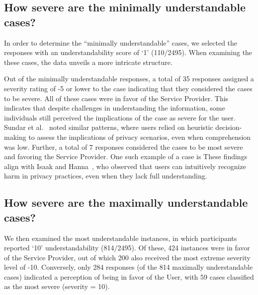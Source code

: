 {%
\subsection{How severe are the minimally understandable cases?}

In order to determine the ``minimally understandable'' cases, we selected the responses with an understandability score of `1' (110/2495).
When examining the these cases, the data unveils a more intricate structure.

Out of the minimally understandable responses, a total of 35 responses assigned a severity rating of -5 or lower to the case indicating that they considered the cases to be severe.
All of these cases were in favor of the Service Provider. %
This indicates that despite challenges in understanding the information, some individuals still perceived the implications of the case as severe for the user.
Sundar et al.~\cite{sundar2013unlocking} noted similar patterns, where users relied on heuristic decision-making to assess the implications of privacy scenarios, even when comprehension was low.
Further, a total of 7 responses considered the cases to be most severe and favoring the Service Provider.
One such example of a case is 
These findings align with Isaak and Hanna~\cite{isaak2018user}, who observed that users can intuitively recognize harm in privacy practices, even when they lack full understanding.

\subsection{How severe are the maximally understandable cases?}

We then examined the most understandable instances, in which participants reported `10' understandability (814/2495).
Of these, 424 instances were in favor of the Service Provider, out of which 200 also received the most extreme severity level of -10.
Conversely, only 284 responses (of the 814 maximally understandable cases) indicated a perception of being in favor of the User, with 59 cases classified as the most severe (severity = 10).

}
